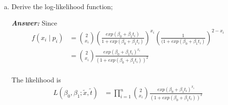 \documentclass[12pt]{article}
\begin{document}
 \begin{enumerate}[(a)]
\item Derive the log-likelihood function;

  \textbf{\color{TealBlue}\emph{Answer: } }
Since
\begin{align*}
f(x_i \mid p_i) &= {2 \choose x_i} \left(\frac{ exp(\beta_0 + \beta_1 t_i) } { 1 +  exp(\beta_0 + \beta_1 t_i)} \right)^{x_i}     \left( \frac{1} { ( 1 +  exp(\beta_0 + \beta_1 t_i) } \right)^{2 - x_i} \\
&=  {2 \choose x_i}  \frac{ exp(\beta_0 + \beta_1 t_i)^{x_i} } { (1 +  exp(\beta_0 + \beta_1 t_i) )^2} \\
\end{align*}

The likelihood is
\begin{align*}
L(\beta_0, \beta_1 ; \tilde x, \tilde t) &= \prod_{i=1}^n {2 \choose x_i} \frac{ exp(\beta_0 + \beta_1 t_i)^{x_i} } { (1 +  exp(\beta_0 + \beta_1 t_i) )^{2}} \\
\end{align*}


\end{enumerate}
\end{document}
